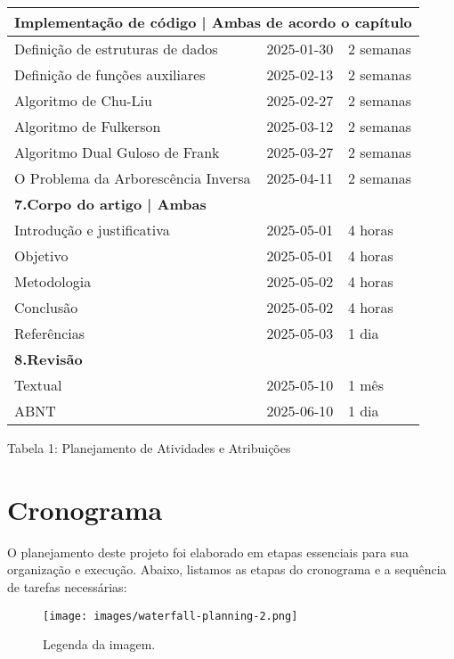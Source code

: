 \documentclass[12pt,a4paper]{article}
\begin{document}
\begin{center}
\begin{tabular}{|l|l|l|}
\hline
\multicolumn{3}{|l|}{\textbf{Implementação de código | Ambas de acordo o capítulo}} \\
\hline
Definição de estruturas de dados & 2025-01-30 & 2 semanas \\
Definição de funções auxiliares & 2025-02-13 & 2 semanas \\
Algoritmo de Chu-Liu & 2025-02-27 & 2 semanas \\
Algoritmo de Fulkerson & 2025-03-12 & 2 semanas \\
Algoritmo Dual Guloso de Frank & 2025-03-27 & 2 semanas \\
O Problema da Arborescência Inversa & 2025-04-11 & 2 semanas \\
\hline
\multicolumn{3}{|l|}{\textbf{7.Corpo do artigo | Ambas}} \\
\hline
Introdução e justificativa & 2025-05-01 & 4 horas \\
Objetivo & 2025-05-01 & 4 horas \\
Metodologia & 2025-05-02 & 4 horas \\
Conclusão & 2025-05-02 & 4 horas \\
Referências & 2025-05-03 & 1 dia \\
\hline
\multicolumn{3}{|l|}{\textbf{8.Revisão}} \\
\hline
Textual & 2025-05-10 & 1 mês \\
ABNT & 2025-06-10 & 1 dia \\
\hline
\end{tabular}
\end{center}
\begin{center}
\caption{} Tabela 1: Planejamento de Atividades e Atribuições
\end{center}

\section{Cronograma}
O planejamento deste projeto foi elaborado em etapas essenciais para sua organização e execução. Abaixo, listamos as etapas do cronograma e a sequência de tarefas necessárias:
\begin{figure}[h!]
    \centering
    \texttt{[image: images/waterfall-planning-2.png]}
    \caption{Legenda da imagem.}
    \label{fig:Cronograma}
\end{figure}

\end{document}
